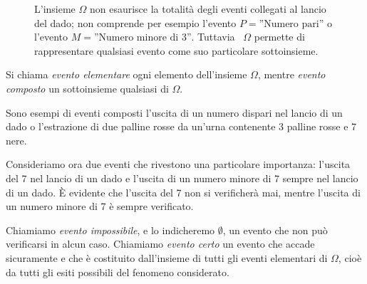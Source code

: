 \begin{inaccessibleblock}
 \begin{figure}[htpb]
\begin{minipage}[c]{.55\textwidth}
L'insieme $\Omega $ non esaurisce la totalità degli eventi collegati al lancio 
del dado; non comprende per esempio l'evento $P=\text{''Numero pari''}$ o 
l'evento $M=\text{''Numero minore di 3''}$. Tuttavia~ $\Omega $ permette di 
rappresentare qualsiasi 
evento come suo particolare sottoinsieme.
\end{minipage}\hfil
\begin{minipage}[c]{.35\textwidth}
\end{minipage}
\end{figure}
\end{inaccessibleblock}

\begin{definizione}
Si chiama \emph{evento elementare} ogni elemento dell'insieme $\Omega$, mentre 
\emph{evento composto} un sottoinsieme qualsiasi di $\Omega$.
\end{definizione}

Sono esempi di eventi composti l'uscita di un numero dispari nel lancio di un 
dado o l'estrazione di due palline rosse da un'urna contenente 3 palline rosse 
e 
7 nere.

Consideriamo ora due eventi che rivestono una particolare importanza: l'uscita 
del 7 nel lancio di un dado e l'uscita di un numero minore di 7 sempre nel 
lancio di un dado. È evidente che l'uscita del 7 non si verificherà mai, mentre 
l'uscita di un numero minore di 7 è sempre verificato.

\begin{definizione}
Chiamiamo \emph{evento impossibile}, e lo indicheremo $\emptyset $, un evento 
che non può verificarsi in alcun caso.
Chiamiamo \emph{evento certo} un evento che accade sicuramente e che è 
costituito dall'insieme di tutti gli eventi elementari di $\Omega $, cioè da 
tutti gli esiti possibili del fenomeno considerato.
\end{definizione}

